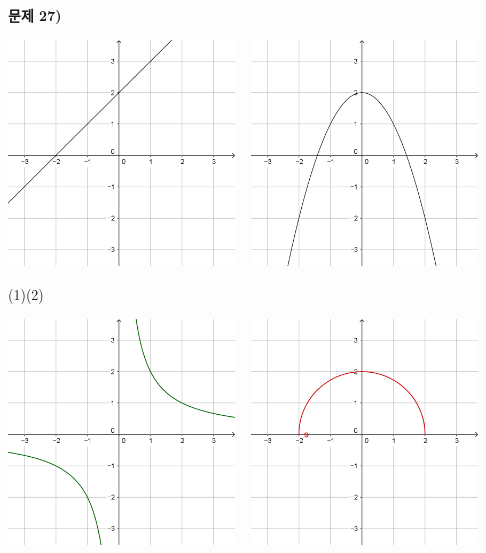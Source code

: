 \documentclass{oblivoir}
\newcommand\an[1]{\par\bigskip\noindent\textbf{문제 #1)}\\}
\begin{document}
\begin{minipage}{0.49\textwidth}
%
\an{27}
\begin{center}
\includegraphics[width=0.45\textwidth]{pm3by3_y=x+2}
~
\includegraphics[width=0.45\textwidth]{pm3by3_y=2-x^2}
\par\noindent(1)\qquad\qquad\qquad\quad\:\:(2)\par\noindent
\includegraphics[width=0.45\textwidth]{pm3by3_y=frac2x}
~
\includegraphics[width=0.45\textwidth]{pm3by3_hemisphere}

\end{center}
\end{minipage}
\end{document}
